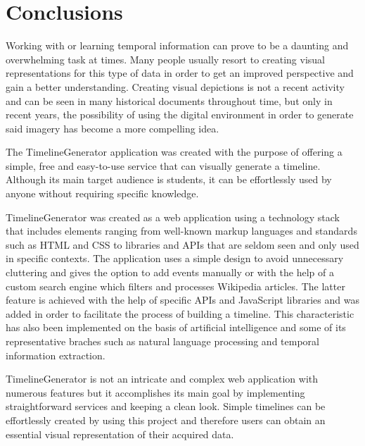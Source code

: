 \documentclass{report}
\begin{document}
\chapter{Conclusions}
Working with or learning temporal information can prove to be a daunting and overwhelming task at times. Many people usually resort to creating visual representations for this type of data in order to get an improved perspective and gain a better understanding. Creating visual depictions is not a recent activity and can be seen in many historical documents throughout time, but only in recent years, the possibility of using the digital environment in order to generate said imagery has become a more compelling idea.\par

The TimelineGenerator application was created with the purpose of offering a simple, free and easy-to-use service that can visually generate a timeline. Although its main target audience is students, it can be effortlessly used by anyone without requiring specific knowledge.\par

TimelineGenerator was created as a web application using a technology stack that includes elements ranging from well-known markup languages and standards such as HTML and CSS to libraries and APIs that are seldom seen and only used in specific contexts. The application uses a simple design to avoid unnecessary cluttering and gives the option to add events manually or with the help of a custom search engine which filters and processes Wikipedia articles. The latter feature is achieved with the help of specific APIs and JavaScript libraries and was added in order to facilitate the process of building a timeline. This characteristic has also been implemented on the basis of artificial intelligence and some of its representative braches such as natural language processing and temporal information extraction.\par

TimelineGenerator is not an intricate and complex web application with numerous features but it accomplishes its main goal by implementing straightforward services and keeping a clean look. Simple timelines can be effortlessly created by using this project and therefore users can obtain an essential visual representation of their acquired data.
\end{document}

